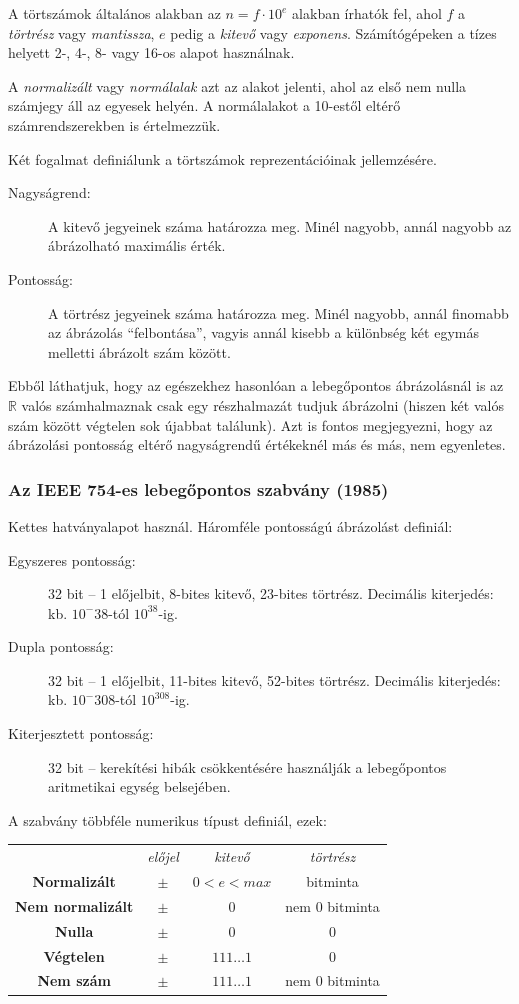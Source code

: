 \documentclass[a4paper]{article}
\begin{document}
A törtszámok általános alakban az $n=f \cdot 10^e$ alakban írhatók fel, ahol $f$ a \emph{törtrész} vagy \emph{mantissza}, $e$ pedig a \emph{kitevő} vagy \emph{exponens}. Számítógépeken a tízes helyett 2-, 4-, 8- vagy 16-os alapot használnak.

A \emph{normalizált} vagy \emph{normálalak} azt az alakot jelenti, ahol az első nem nulla számjegy áll az egyesek helyén. A normálalakot a 10-estől eltérő számrendszerekben is értelmezzük.

Két fogalmat definiálunk a törtszámok reprezentációinak jellemzésére.
\begin{description}
	\item[Nagyságrend:] A kitevő jegyeinek száma határozza meg. Minél nagyobb, annál nagyobb az ábrázolható maximális érték.
	\item[Pontosság:] A törtrész jegyeinek száma határozza meg. Minél nagyobb, annál finomabb az ábrázolás ``felbontása'', vagyis annál kisebb a különbség két egymás melletti ábrázolt szám között.
\end{description}
Ebből láthatjuk, hogy az egészekhez hasonlóan a lebegőpontos ábrázolásnál is az $\mathbb{R}$ valós számhalmaznak csak egy részhalmazát tudjuk ábrázolni (hiszen két valós szám között végtelen sok újabbat találunk). Azt is fontos megjegyezni, hogy az ábrázolási pontosság eltérő nagyságrendű értékeknél más és más, nem egyenletes.

\subsubsection{Az IEEE 754-es lebegőpontos szabvány (1985)}

Kettes hatványalapot használ. Háromféle pontosságú ábrázolást definiál:
\begin{description}
	\item[Egyszeres pontosság:] 32 bit -- 1 előjelbit, 8-bites kitevő, 23-bites törtrész. Decimális kiterjedés: kb. $10^-38$-tól $10^38$-ig.
	\item[Dupla pontosság:] 32 bit -- 1 előjelbit, 11-bites kitevő, 52-bites törtrész. Decimális kiterjedés: kb. $10^-308$-tól $10^308$-ig.
	\item[Kiterjesztett pontosság:] 32 bit -- kerekítési hibák csökkentésére használják a lebegőpontos aritmetikai egység belsejében.
\end{description}

A szabvány többféle numerikus típust definiál, ezek:

\vspace{3mm}
\begin{tabular}{c c c c}
	& \emph{előjel} & \emph{kitevő} & \emph{törtrész}\\
	\textbf{Normalizált} & $\pm$ & $0<e<max$ & bitminta\\
	\textbf{Nem normalizált} & $\pm$ & 0 & nem 0 bitminta\\
	\textbf{Nulla} & $\pm$ & 0 & 0\\
	\textbf{Végtelen} & $\pm$ & $111\dots1$ & 0\\
	\textbf{Nem szám} & $\pm$ & $111\dots1$ & nem 0 bitminta\\
\end{tabular}
\vspace{3mm}
\end{document}
